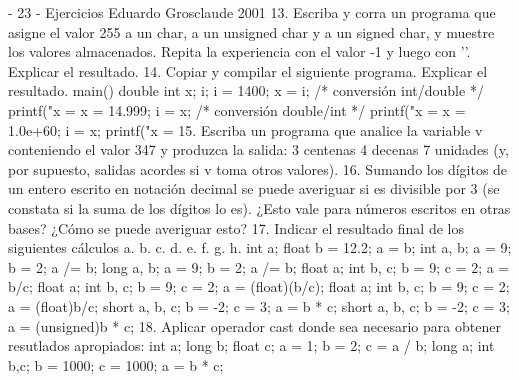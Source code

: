 - 23 -
Ejercicios
Eduardo Grosclaude 2001
13. Escriba y corra un programa que asigne el valor 255 a un char, a un unsigned char y a un signed
char, y muestre los valores almacenados. Repita la experiencia con el valor -1 y luego con ’’.
Explicar el resultado.
14. Copiar y compilar el siguiente programa. Explicar el resultado.
main()
{
double
int
x;
i;
i = 1400;
x = i; /* conversión int/double */
printf("x = %
x = 14.999;
i = x; /* conversión double/int */
printf("x = %
x = 1.0e+60;
i = x;
printf("x = %
}
15. Escriba un programa que analice la variable v conteniendo el valor 347 y produzca la salida:
3 centenas
4 decenas
7 unidades
(y, por supuesto, salidas acordes si v toma otros valores).
16. Sumando los dígitos de un entero escrito en notación decimal se puede averiguar si es divisible por
3 (se constata si la suma de los dígitos lo es). ¿Esto vale para números escritos en otras bases? ¿Cómo
se puede averiguar esto?
17. Indicar el resultado final de los siguientes cálculos
a.
b.
c.
d.
e.
f.
g.
h.
int a; float b = 12.2; a = b;
int a, b; a = 9; b = 2; a /= b;
long a, b; a = 9; b = 2; a /= b;
float a; int b, c; b = 9; c = 2; a = b/c;
float a; int b, c; b = 9; c = 2; a = (float)(b/c);
float a; int b, c; b = 9; c = 2; a = (float)b/c;
short a, b, c; b = -2; c = 3; a = b * c;
short a, b, c; b = -2; c = 3; a = (unsigned)b * c;
18. Aplicar operador cast donde sea necesario para obtener resutlados apropiados:
int a; long b; float c;
a = 1; b = 2; c = a / b;
long a; int b,c;
b = 1000; c = 1000;
a = b * c;
